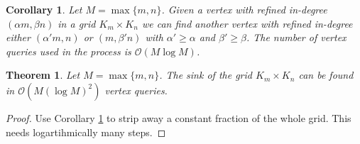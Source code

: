 \documentclass[a4paper,10pt]{article}
\newtheorem{corollary}{Corollary}
\newtheorem{theorem}{Theorem}
\newcommand{\indegree}{refined in-degree\xspace}
\begin{document}
\begin{corollary}
\label{cor:hit_wall}
 Let $M = \max\{m,n\}$. Given a vertex with \indegree $(\alpha m,\beta n)$ in a grid $K_{m} \times K_{n}$ we can find another vertex with \indegree either $(\alpha' m, n)$ or $(m, \beta' n)$ with $\alpha' \geq \alpha$ and $\beta ' \geq \beta$. The number of vertex queries used in the process is $\mathcal{O}(M\log M)$. 
\end{corollary}

\begin{theorem}
 Let $M = \max\{m,n\}$. The sink of the grid $K_{m} \times K_{n}$ can be found in $\mathcal{O}(M(\log M)^2)$ vertex queries.
\end{theorem}

\begin{proof}
 Use Corollary \ref{cor:hit_wall} to strip away a constant fraction of the whole grid. This needs logartihmically many steps. 
\end{proof}





\end{document}
